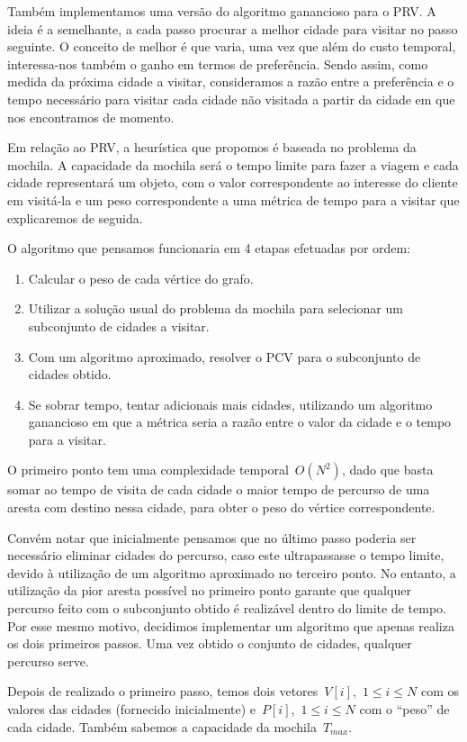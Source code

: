 \documentclass[12pt,a4paper,reqno]{report}
\numberwithin{equation}{section}
\begin{document}
Também implementamos uma versão do algoritmo ganancioso para o PRV. A ideia é a semelhante, a cada passo procurar a melhor cidade para visitar no passo seguinte. O conceito de melhor é que varia, uma vez que além do custo temporal, interessa-nos também o ganho em termos de preferência. Sendo assim, como medida da próxima cidade a visitar, consideramos a razão entre a preferência e o tempo necessário para visitar cada cidade não visitada a partir da cidade em que nos encontramos de momento.

Em relação ao PRV, a heurística que propomos é baseada no problema da mochila. A capacidade da mochila será o tempo limite para fazer a viagem e cada cidade representará um objeto, com o valor correspondente ao interesse do cliente em visitá-la e um peso correspondente a uma métrica de tempo para a visitar que explicaremos de seguida.

O algoritmo que pensamos funcionaria em 4 etapas efetuadas por ordem:
\begin{enumerate}
	\item Calcular o peso de cada vértice do grafo.
	\item Utilizar a solução usual do problema da mochila para selecionar um subconjunto de cidades a visitar.
	\item Com um algoritmo aproximado, resolver o PCV para o subconjunto de cidades obtido.
	\item Se sobrar tempo, tentar adicionais mais cidades, utilizando um algoritmo ganancioso em que a métrica seria a razão entre o valor da cidade e o tempo para a visitar.
\end{enumerate}

O primeiro ponto tem uma complexidade temporal~$O(N^2)$, dado que basta somar ao tempo de visita de cada cidade o maior tempo de percurso de uma aresta com destino nessa cidade, para obter o peso do vértice correspondente. 

Convém notar que inicialmente pensamos que no último passo poderia ser necessário eliminar cidades do percurso, caso este ultrapassasse o tempo limite, devido à utilização de um algoritmo aproximado no terceiro ponto. No entanto, a utilização da pior aresta possível no primeiro ponto garante que qualquer percurso feito com o subconjunto obtido é realizável dentro do limite de tempo. Por esse mesmo motivo, decidimos implementar um algoritmo que apenas realiza os dois primeiros passos. Uma vez obtido o conjunto de cidades, qualquer percurso serve.

Depois de realizado o primeiro passo, temos dois vetores~$V[i]$,~$1 \leq i \leq N$ com os valores das cidades (fornecido inicialmente) e~$P[i]$,~$1 \leq i \leq N$ com o ``peso'' de cada cidade. Também sabemos a capacidade da mochila~$T_{max}$. 
\end{document}
